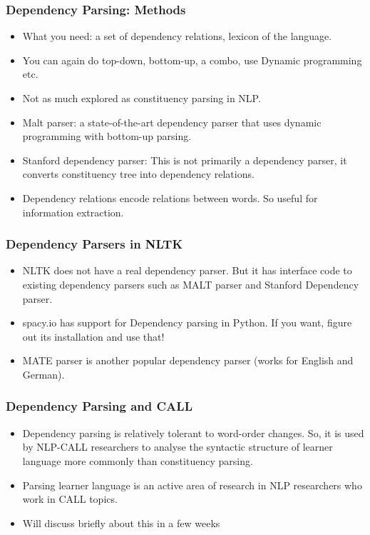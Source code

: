 \documentclass{beamer}
\begin{document}
\begin{frame}
\frametitle{Dependency Parsing: Methods}
\begin{itemize}
\item What you need: a set of dependency relations, lexicon of the language.
\item You can again do top-down, bottom-up, a combo, use Dynamic programming etc.
\item Not as much explored as constituency parsing in NLP.
\item Malt parser: a state-of-the-art dependency parser that uses dynamic programming with bottom-up parsing.
\item Stanford dependency parser: This is not primarily a dependency parser, it converts constituency tree into dependency relations.
\item Dependency relations encode relations between words. So useful for information extraction.
\end{itemize}
\end{frame}

\begin{frame}
\frametitle{Dependency Parsers in NLTK}
\begin{itemize}
\item NLTK does not have a real dependency parser. But it has interface code to existing dependency parsers such as MALT parser and Stanford Dependency parser.
\item spacy.io has support for Dependency parsing in Python. If you want, figure out its installation and use that!
\item MATE parser is another popular dependency parser (works for English and German).
\end{itemize}
\end{frame}

\begin{frame}
\frametitle{Dependency Parsing and CALL}
\begin{itemize}
\item Dependency parsing is relatively tolerant to word-order changes. So, it is used by NLP-CALL researchers to analyse the syntactic structure of learner language more commonly than constituency parsing.
\item Parsing learner language is an active area of research in NLP researchers who work in CALL topics.
\item Will discuss briefly about this in a few weeks
\end{itemize}
\end{frame}
\end{document}

